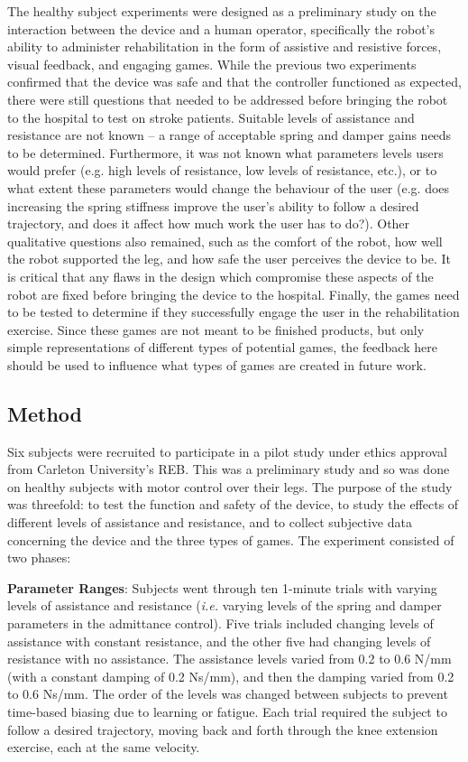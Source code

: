 \documentclass[12pt]{report}
\begin{document}
	The healthy subject experiments were designed as a preliminary study on the interaction between the device and a human operator, specifically the robot's ability to administer rehabilitation in the form of assistive and resistive forces, visual feedback, and engaging games. While the previous two experiments confirmed that the device was safe and that the controller functioned as expected, there were still questions that needed to be addressed before bringing the robot to the hospital to test on stroke patients. Suitable levels of assistance and resistance are not known -- a range of acceptable spring and damper gains needs to be determined. Furthermore, it was not known what parameters levels users would prefer (e.g. high levels of resistance, low levels of resistance, etc.), or to what extent these parameters would change the behaviour of the user (e.g. does increasing the spring stiffness improve the user's ability to follow a desired trajectory, and does it affect how much work the user has to do?). Other qualitative questions also remained, such as the comfort of the robot, how well the robot supported the leg, and how safe the user perceives the device to be. It is critical that any flaws in the design which compromise these aspects of the robot are fixed before bringing the device to the hospital. Finally, the games need to be tested to determine if they successfully engage the user in the rehabilitation exercise. Since these games are not meant to be finished products, but only simple representations of different types of potential games, the feedback here should be used to influence what types of games are created in future work.  
	
		\subsection{Method}
		
		Six subjects were recruited to participate in a pilot study under ethics approval from Carleton University's REB. This was a preliminary study and so was done on healthy subjects with motor control over their legs. The purpose of the study was threefold: to test the function and safety of the device, to study the effects of different levels of assistance and resistance, and to collect subjective data concerning the device and the three types of games. The experiment consisted of two phases: 

\textbf{Parameter Ranges}: Subjects went through ten 1-minute trials with varying levels of assistance and resistance (\textit{i.e.} varying levels of the spring and damper parameters in the admittance control). Five trials included changing levels of assistance with constant resistance, and the other five had changing levels of resistance with no assistance. The assistance levels varied from 0.2 to 0.6 N/mm (with a constant damping of 0.2 Ns/mm), and then the damping varied from 0.2 to 0.6 Ns/mm. The order of the levels was changed between subjects to prevent time-based biasing due to learning or fatigue. Each trial required the subject to follow a desired trajectory, moving back and forth through the knee extension exercise, each at the same velocity. 
\end{document}
